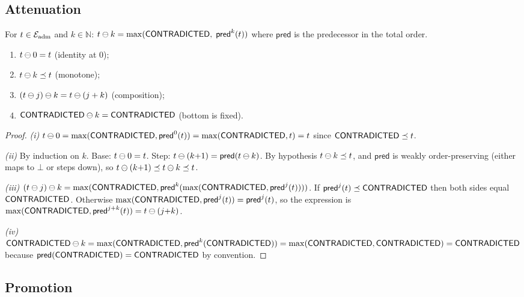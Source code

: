 \documentclass[11pt]{article}
\begin{document}
\subsection{Attenuation}\label{sec:atten}

\begin{definition}[Attenuation]\label{def:atten}
For $t \in \mathcal{E}_{\mathrm{adm}}$ and $k \in \mathbb{N}$:
$t \ominus k = \max(\mathsf{CONTRADICTED},\; \mathsf{pred}^k(t))$
where $\mathsf{pred}$ is the predecessor in the total order.
\end{definition}

\begin{proposition}\label{prop:atten}
\begin{enumerate}[nosep,label=(\roman*)]
  \item $t \ominus 0 = t$ (identity at 0);
  \item $t \ominus k \preceq t$ (monotone);
  \item $(t \ominus j) \ominus k = t \ominus (j+k)$ (composition);
  \item $\mathsf{CONTRADICTED} \ominus k = \mathsf{CONTRADICTED}$ (bottom is fixed).
\end{enumerate}
\end{proposition}

\begin{proof}
\emph{(i)} $t \ominus 0 = \max(\mathsf{CONTRADICTED}, \mathsf{pred}^0(t))
= \max(\mathsf{CONTRADICTED}, t) = t$ since $\mathsf{CONTRADICTED} \preceq t$.

\emph{(ii)} By induction on $k$.  Base: $t \ominus 0 = t$.
Step: $t \ominus (k{+}1) = \mathsf{pred}(t \ominus k)$.
By hypothesis $t \ominus k \preceq t$, and $\mathsf{pred}$
is weakly order-preserving (either maps to $\bot$ or steps
down), so $t \ominus (k{+}1) \preceq t \ominus k \preceq t$.

\emph{(iii)} $(t \ominus j) \ominus k
= \max(\mathsf{CONTRADICTED}, \mathsf{pred}^k(\max(\mathsf{CONTRADICTED}, \mathsf{pred}^j(t))))$.
If $\mathsf{pred}^j(t) \preceq \mathsf{CONTRADICTED}$ then both sides equal $\mathsf{CONTRADICTED}$.
Otherwise $\max(\mathsf{CONTRADICTED}, \mathsf{pred}^j(t)) = \mathsf{pred}^j(t)$,
so the expression is $\max(\mathsf{CONTRADICTED}, \mathsf{pred}^{j+k}(t))
= t \ominus (j{+}k)$.

\emph{(iv)} $\mathsf{CONTRADICTED} \ominus k = \max(\mathsf{CONTRADICTED},
\mathsf{pred}^k(\mathsf{CONTRADICTED})) = \max(\mathsf{CONTRADICTED}, \mathsf{CONTRADICTED}) = \mathsf{CONTRADICTED}$
because $\mathsf{pred}(\mathsf{CONTRADICTED}) = \mathsf{CONTRADICTED}$ by convention.
\end{proof}

\subsection{Promotion}\label{sec:promote}
\end{document}
